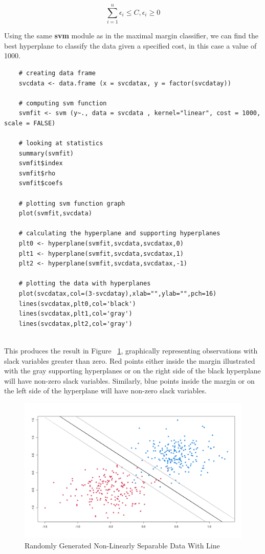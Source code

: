 \documentclass[12pt]{article}
\begin{document}
\begin{equation}\label{slackvariables}
\sum_{i=1}^{n} \epsilon_i \le C, \epsilon_i \ge 0
\end{equation}

Using the same \textbf{svm} module as in the maximal margin classifier, we can find the best hyperplane to classify the data given a specified cost, in this case a value of 1000.

\begin{verbatim}
    # creating data frame 
    svcdata <- data.frame (x = svcdatax, y = factor(svcdatay))
    
    # computing svm function
    svmfit <- svm (y~., data = svcdata , kernel="linear", cost = 1000, scale = FALSE)
    
    # looking at statistics
    summary(svmfit)
    svmfit$index
    svmfit$rho
    svmfit$coefs
    
    # plotting svm function graph
    plot(svmfit,svcdata)
    
    # calculating the hyperplane and supporting hyperplanes
    plt0 <- hyperplane(svmfit,svcdata,svcdatax,0)
    plt1 <- hyperplane(svmfit,svcdata,svcdatax,1)
    plt2 <- hyperplane(svmfit,svcdata,svcdatax,-1)
    
    # plotting the data with hyperplanes
    plot(svcdatax,col=(3-svcdatay),xlab="",ylab="",pch=16)
    lines(svcdatax,plt0,col='black')
    lines(svcdatax,plt1,col='gray')
    lines(svcdatax,plt2,col='gray')
    
\end{verbatim}

This produces the result in Figure ~\ref{fig_svc_data_w_hyperplanes}, graphically representing observations with slack variables greater than zero. Red points either inside the margin illustrated with the gray supporting hyperplanes or on the right side of the black hyperplane will have non-zero slack variables. Similarly, blue points inside the margin or on the left side of the hyperplane will have non-zero slack variables.

\begin{figure}[H]
    \centering
    \includegraphics[width=5in]{Figures/svc_data_w_hyperplanes.png}
    \caption{Randomly Generated Non-Linearly Separable Data With Line}
    \label{fig_svc_data_w_hyperplanes}
\end{figure}
\end{document}
